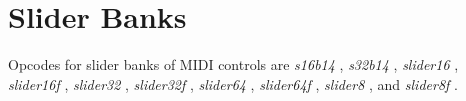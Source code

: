 \begin{comment}
\documentclass[10pt]{article}
\usepackage{fullpage, graphicx, url}
\setlength{\parskip}{1ex}
\setlength{\parindent}{0ex}
\title{Slider Banks}



\begin{tabular}{ccc}
The Alternative Csound Reference Manual & & \\
Previous &MIDI Support &Next

\end{tabular}

\end{comment}
\section{Slider Banks}


  Opcodes for slider banks of MIDI controls are \emph{s16b14}
, \emph{s32b14}
, \emph{slider16}
, \emph{slider16f}
, \emph{slider32}
, \emph{slider32f}
, \emph{slider64}
, \emph{slider64f}
, \emph{slider8}
, and \emph{slider8f}
. 


\begin{comment}
\begin{tabular}{lcr}
Previous &Home &Next \\
Real-time Messages &Up &Pitch Converters

\end{tabular}



\end{comment}
